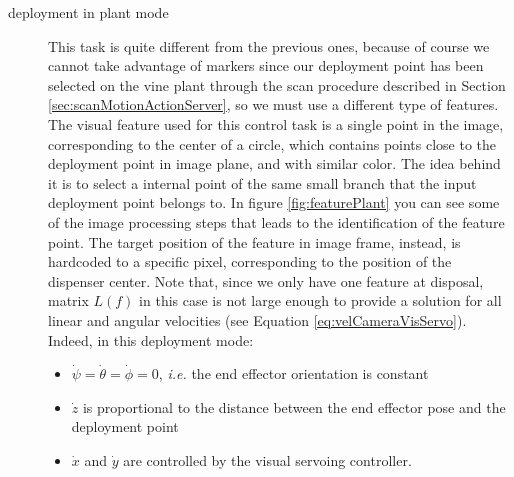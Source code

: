\begin{description}
\item[deployment in plant mode] This task is quite different from the previous ones, because of course we cannot take advantage of markers since our deployment point has been selected on the vine plant through the scan procedure described in Section \ref{sec:scanMotionActionServer}, so we must use a different type of features.
The visual feature used for this control task is a single point in the image, corresponding to the center of a circle, which contains points close to the deployment point in image plane, and with similar color. The idea behind it is to select a internal point of the same small branch that the input deployment point belongs to. In figure \ref{fig:featurePlant} you can see some of the image processing steps that leads to the identification of the feature point. The target position of the feature in image frame, instead, is hardcoded to a specific pixel, corresponding to the position of the dispenser center.
Note that, since we only have one feature at disposal, matrix $L(f)$ in this case is not large enough to provide a solution for all linear and angular velocities (see Equation \ref{eq:velCameraVisServo}). Indeed, in this deployment mode:
\begin{itemize}
	\item $\dot{\psi}=\dot{\theta}=\dot{\phi}=0$, \textit{i.e.} the end effector orientation is constant
	\item $\dot{z}$ is proportional to the distance between the end effector pose and the deployment point
	\item $\dot{x}$ and $\dot{y}$ are controlled by the visual servoing controller.
\end{itemize}

\end{description}


